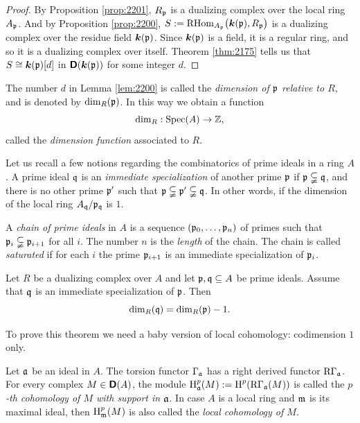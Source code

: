 \begin{proof}
By Proposition \ref{prop:2201}, $R_{\mathfrak{p}}$ is a dualizing complex over the local 
ring $A_{\mathfrak{p}}$. And by Proposition \ref{prop:2200},
$S := \operatorname{RHom}_{A_{\mathfrak{p}}} \bigl( \boldsymbol{k}(\mathfrak{p}), R_{\mathfrak{p}} \bigr)$ 
is a dualizing complex over the residue field $\boldsymbol{k}(\mathfrak{p})$.  
Since $\boldsymbol{k}(\mathfrak{p})$ is a field, it is a regular ring, and so it is a dualizing 
complex over itself. Theorem  \ref{thm:2175} tells us that 
$S \cong \boldsymbol{k}(\mathfrak{p})[d]$ in $\boldsymbol{\mathsf{D}}(\boldsymbol{k}(\mathfrak{p}))$ 
for some integer $d$.  
\end{proof}

\begin{dfn} \label{dfn:2200}
The number $d$ in Lemma \ref{lem:2200} is called the {\em dimension of $\mathfrak{p}$ 
relative to $R$}, and is denoted by $\operatorname{dim}_R(\mathfrak{p})$. 
In this way we obtain a function
\[  \operatorname{dim}_R : \operatorname{Spec}(A) \to  \mathbb{Z} , \]
called the {\em dimension function} 
associated to $R$. 
\end{dfn}

Let us recall a few notions regarding the combinatorics of prime ideals in a 
ring $A$. A prime ideal $\mathfrak{q}$ is an {\em immediate specialization} of another 
prime $\mathfrak{p}$ if $\mathfrak{p} \subsetneqq \mathfrak{q}$, and there is no other prime $\mathfrak{p}'$ such that 
$\mathfrak{p} \subsetneqq \mathfrak{p}' \subsetneqq \mathfrak{q}$. 
In other words, if the dimension of the local ring $A_{\mathfrak{q}} / \mathfrak{p}_{\mathfrak{q}}$ is $1$. 

A {\em chain of prime ideals} in $A$ is a sequence 
$(\mathfrak{p}_0, \ldots, \mathfrak{p}_n)$ of primes such that 
$\mathfrak{p}_i \subsetneqq \mathfrak{p}_{i + 1}$ for all $i$. The number $n$ is the {\em length} 
of the chain. The chain is called {\em saturated} if for each $i$ the prime 
$\mathfrak{p}_{i + 1}$ is an immediate specialization of $\mathfrak{p}_i$. 

\begin{thm} \label{thm:2205}
Let $R$ be a dualizing complex over $A$ and let $\mathfrak{p}, \mathfrak{q} \subseteq A$ be prime 
ideals. Assume that $\mathfrak{q}$ is an immediate specialization of $\mathfrak{p}$. Then
\[ \operatorname{dim}_R(\mathfrak{q}) = \operatorname{dim}_R(\mathfrak{p}) - 1 . \]
\end{thm}

To prove this theorem we need a baby version of local cohomology: 
codimension $1$ only. 

Let $\mathfrak{a}$ be an ideal in $A$. 
The torsion functor $\Gamma_{\mathfrak{a}}$ has a right derived functor
$\mathrm{R} \Gamma_{\mathfrak{a}}$. For every complex $M \in \boldsymbol{\mathsf{D}}(A)$, the module 
$\operatorname{H}^p_{\mathfrak{a}}(M) := \operatorname{H}^p(\mathrm{R} \Gamma_{\mathfrak{a}}(M))$ 
is called the {\em $p$-th cohomology of $M$ with support in $\mathfrak{a}$}. 
In case $A$ is a local ring and $\mathfrak{m}$ is its maximal ideal, then 
$\operatorname{H}^p_{\mathfrak{m}}(M)$ is also called the {\em local cohomology of $M$}. 

